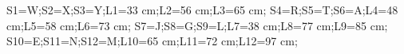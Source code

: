 \documentclass[exercice]{thedocument}%
\begin{document}
%
\>S1=W;\>S2=X;\>S3=Y;\>L1=33 cm;\>L2=56 cm;\>L3=65 cm;%
\>S4=R;\>S5=T;\>S6=A;\>L4=48 cm;\>L5=58 cm;\>L6=73 cm;%
\>S7=J;\>S8=G;\>S9=L;\>L7=38 cm;\>L8=77 cm;\>L9=85 cm;%
\>S10=E;\>S11=N;\>S12=M;\>L10=65 cm;\>L11=72 cm;\>L12=97 cm;%
%
\end{document}
